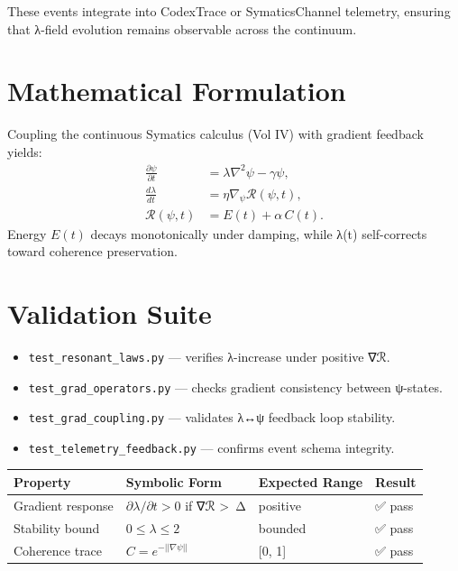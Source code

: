 \documentclass[11pt]{article}
\begin{document}
These events integrate into CodexTrace or SymaticsChannel telemetry,
ensuring that λ-field evolution remains observable across the continuum.

\section{Mathematical Formulation}
Coupling the continuous Symatics calculus (Vol IV) with gradient feedback yields:
\[
\begin{aligned}
\frac{\partial\psi}{\partial t} &= \lambda\nabla^2\psi - \gamma\psi,\\[4pt]
\frac{d\lambda}{dt} &= \eta\nabla_\psi\mathcal{R}(\psi,t),\\[4pt]
\mathcal{R}(\psi,t) &= E(t) + \alpha\,C(t).
\end{aligned}
\]
Energy \(E(t)\) decays monotonically under damping, while λ(t) self-corrects
toward coherence preservation.

\section{Validation Suite}
\begin{itemize}
  \item \texttt{test\_resonant\_laws.py} — verifies λ-increase under positive ∇ℛ.  
  \item \texttt{test\_grad\_operators.py} — checks gradient consistency between ψ-states.  
  \item \texttt{test\_grad\_coupling.py} — validates λ↔ψ feedback loop stability.  
  \item \texttt{test\_telemetry\_feedback.py} — confirms event schema integrity.  
\end{itemize}

\begin{center}
\renewcommand{\arraystretch}{1.3}
\begin{tabular}{llll}
\toprule
\textbf{Property} & \textbf{Symbolic Form} & \textbf{Expected Range} & \textbf{Result}\\
\midrule
Gradient response & \(∂λ/∂t>0\) if ∇ℛ >\ Δ & positive & ✅ pass\\
Stability bound & \(0 ≤ λ ≤ 2\) & bounded & ✅ pass\\
Coherence trace & \(C=e^{-||∇ψ||}\) & [0, 1] & ✅ pass\\
\bottomrule
\end{tabular}
\end{center}
\end{document}
